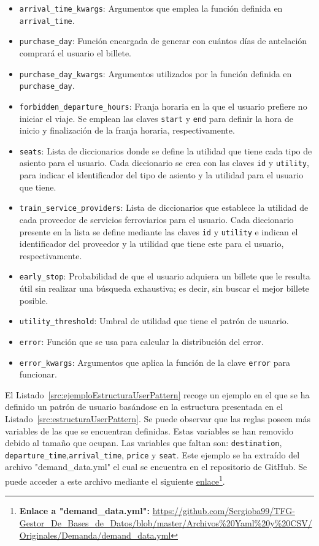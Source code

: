 \begin{itemize}
    \item \texttt{arrival\_time\_kwargs}: Argumentos que emplea la función definida en \texttt{arrival\_time}.
    \item \texttt{purchase\_day}: Función encargada de generar con cuántos días de antelación comprará el usuario el billete.
    \item \texttt{purchase\_day\_kwargs}: Argumentos utilizados por la función definida en \texttt{purchase\_day}.
    \item \texttt{forbidden\_departure\_hours}: Franja horaria en la que el usuario prefiere no iniciar el viaje. Se emplean las claves \texttt{start} y \texttt{end} para definir la hora de inicio y finalización de la franja horaria, respectivamente.
    \item \texttt{seats}: Lista de diccionarios donde se define la utilidad que tiene cada tipo de asiento para el usuario. Cada diccionario se crea con las claves \texttt{id} y \texttt{utility}, para indicar el identificador del tipo de asiento y la utilidad para el usuario que tiene.
    \item \texttt{train\_service\_providers}: Lista de diccionarios que establece la utilidad de cada proveedor de servicios ferroviarios para el usuario. Cada diccionario presente en la lista se define mediante las claves \texttt{id} y \texttt{utility} e indican el identificador del proveedor y la utilidad que tiene este para el usuario, respectivamente.
    \item \texttt{early\_stop}: Probabilidad de que el usuario adquiera un billete que le resulta útil sin realizar una búsqueda exhaustiva; es decir, sin buscar el mejor billete posible.
    \item \texttt{utility\_threshold}: Umbral de utilidad que tiene el patrón de usuario.
    \item \texttt{error}: Función que se usa para calcular la distribución del error.
    \item \texttt{error\_kwargs}: Argumentos que aplica la función de la clave \texttt{error} para funcionar.
\end{itemize}

El Listado~\ref{src:ejemploEstructuraUserPattern} recoge un ejemplo en el que se ha definido un patrón de usuario basándose en la estructura presentada en el Listado~\ref{src:estructuraUserPattern}. Se puede observar que las reglas poseen más variables de las que se encuentran definidas. Estas variables se han removido debido al tamaño que ocupan. Las variables que faltan son: \texttt{destination}, \texttt{departure\_time},\texttt{arrival\_time}, \texttt{price} y \texttt{seat}. Este ejemplo se ha extraído del archivo "demand\_data.yml" el cual se encuentra en el repositorio de GitHub. Se puede acceder a este archivo mediante el siguiente \href{https://github.com/Sergioba99/TFG-Gestor_De_Bases_de_Datos/blob/master/Archivos%20Yaml%20y%20CSV/Originales/Demanda/demand_data.yml}{enlace}\footnote{\textbf{Enlace a "demand\_data.yml":} \url{https://github.com/Sergioba99/TFG-Gestor\_De\_Bases\_de\_Datos/blob/master/Archivos\%20Yaml\%20y\%20CSV/Originales/Demanda/demand\_data.yml}}.

